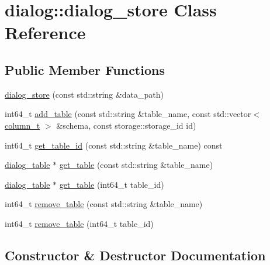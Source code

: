 \hypertarget{classdialog_1_1dialog__store}{}\section{dialog\+:\+:dialog\+\_\+store Class Reference}
\label{classdialog_1_1dialog__store}
\subsection*{Public Member Functions}
\begin{DoxyCompactItemize}
\item 
\hyperlink{classdialog_1_1dialog__store_a88dd772873fbd8c51bb21baa7302ebee}{dialog\+\_\+store} (const std\+::string \&data\+\_\+path)
\item 
int64\+\_\+t \hyperlink{classdialog_1_1dialog__store_aec46cdcce3866d0840cf01528eb5e6c0}{add\+\_\+table} (const std\+::string \&table\+\_\+name, const std\+::vector$<$ \hyperlink{classdialog_1_1column__t}{column\+\_\+t} $>$ \&schema, const storage\+::storage\+\_\+id id)
\item 
int64\+\_\+t \hyperlink{classdialog_1_1dialog__store_a749d49076f2107e32b65be5d79d5781c}{get\+\_\+table\+\_\+id} (const std\+::string \&table\+\_\+name) const
\item 
\hyperlink{classdialog_1_1dialog__table}{dialog\+\_\+table} $\ast$ \hyperlink{classdialog_1_1dialog__store_a3d951f8e4bc697af2fdd7b9f225453d8}{get\+\_\+table} (const std\+::string \&table\+\_\+name)
\item 
\hyperlink{classdialog_1_1dialog__table}{dialog\+\_\+table} $\ast$ \hyperlink{classdialog_1_1dialog__store_a7fb7214a8098e54fd3d2ac0bfae4a431}{get\+\_\+table} (int64\+\_\+t table\+\_\+id)
\item 
int64\+\_\+t \hyperlink{classdialog_1_1dialog__store_a15b6b065d529ede947ff3ca4db77ab56}{remove\+\_\+table} (const std\+::string \&table\+\_\+name)
\item 
int64\+\_\+t \hyperlink{classdialog_1_1dialog__store_a7557cfcb6f7f5458031b7b3971d9d7cd}{remove\+\_\+table} (int64\+\_\+t table\+\_\+id)
\end{DoxyCompactItemize}


\subsection{Constructor \& Destructor Documentation}
\mbox{\label{classdialog_1_1dialog__store_a88dd772873fbd8c51bb21baa7302ebee}} 
